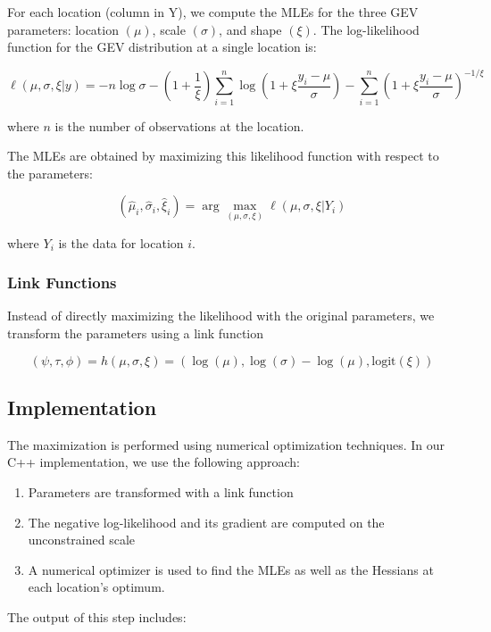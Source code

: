 \documentclass[
  letterpaper,
  DIV=11,
  numbers=noendperiod]{scrartcl}
\providecommand{\tightlist}{%
  \setlength{\itemsep}{0pt}\setlength{\parskip}{0pt}}\usepackage{longtable,booktabs,array}
\begin{document}
For each location (column in Y), we compute the MLEs for the three GEV
parameters: location \((\mu)\), scale \((\sigma)\), and shape \((\xi)\).
The log-likelihood function for the GEV distribution at a single
location is:

\[
\ell(\mu, \sigma, \xi | y) = -n\log\sigma - (1+\frac{1}{\xi})\sum_{i=1}^n \log\left(1+\xi\frac{y_i-\mu}{\sigma}\right) - \sum_{i=1}^n \left(1+\xi\frac{y_i-\mu}{\sigma}\right)^{-1/\xi}
\]

where \(n\) is the number of observations at the location.

The MLEs are obtained by maximizing this likelihood function with
respect to the parameters:

\[
(\hat{\mu}_i, \hat{\sigma}_i, \hat{\xi}_i) = \arg\max_{(\mu, \sigma, \xi)} \ell(\mu, \sigma, \xi | Y_i)
\]

where \(Y_i\) is the data for location \(i\).

\subsubsection{Link Functions}\label{link-functions}

Instead of directly maximizing the likelihood with the original
parameters, we transform the parameters using a link function

\[
\left(\psi, \tau, \phi\right) = h(\mu, \sigma, \xi) = \left(\log(\mu), \log(\sigma) - \log(\mu), \text{logit}(\xi)\right)
\]

\subsection{Implementation}\label{implementation}

The maximization is performed using numerical optimization techniques.
In our C++ implementation, we use the following approach:

\begin{enumerate}
\def\labelenumi{\arabic{enumi}.}
\tightlist
\item
  Parameters are transformed with a link function
\item
  The negative log-likelihood and its gradient are computed on the
  unconstrained scale
\item
  A numerical optimizer is used to find the MLEs as well as the Hessians
  at each location's optimum.
\end{enumerate}

The output of this step includes:
\end{document}
